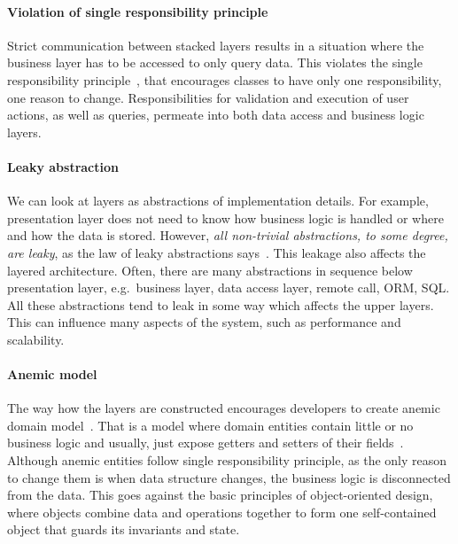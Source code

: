 \documentclass{book}
\begin{document}
\paragraph{Violation of single responsibility
principle}\label{violation-of-single-responsibility-principle}

Strict communication between stacked layers results in a situation where
the business layer has to be accessed to only query data. This violates
the single responsibility principle~\cite{srp-violation}, that
encourages classes to have only one responsibility, one reason to
change. Responsibilities for validation and execution of user actions,
as well as queries, permeate into both data access and business logic
layers.

\paragraph{Leaky abstraction}\label{leaky-abstraction}

We can look at layers as abstractions of implementation details. For
example, presentation layer does not need to know how business logic is
handled or where and how the data is stored. However, \emph{all
non-trivial abstractions, to some degree, are leaky}, as the law of
leaky abstractions says~\cite{leaky}. This leakage also affects the
layered architecture. Often, there are many abstractions in sequence
below presentation layer, e.g.~business layer, data access layer, remote
call, ORM, SQL. All these abstractions tend to leak in some way which
affects the upper layers. This can influence many aspects of the system,
such as performance and scalability.

\paragraph{Anemic model}\label{anemic-model}

The way how the layers are constructed encourages developers to create
anemic domain model~\cite{layered-anemic}. That is a model where domain
entities contain little or no business logic and usually, just expose
getters and setters of their fields~\cite{anemic}. Although anemic
entities follow single responsibility principle, as the only reason to
change them is when data structure changes, the business logic is
disconnected from the data. This goes against the basic principles of
object-oriented design, where objects combine data and operations
together to form one self-contained object that guards its invariants
and state.
\end{document}
